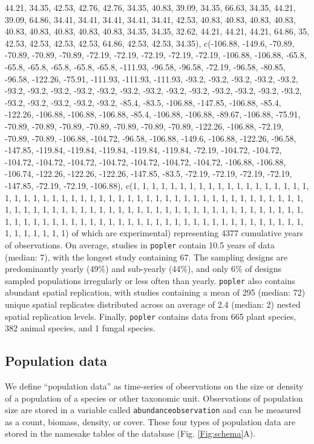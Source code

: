 \documentclass{article}\usepackage[]{graphicx}\usepackage[]{color}
\begin{document}
44.21, 34.35, 42.53, 42.76, 42.76, 34.35, 40.83, 39.09, 34.35, 66.63, 34.35, 44.21, 39.09, 64.86, 34.41, 34.41, 34.41, 34.41, 34.41, 42.53, 40.83, 40.83, 40.83, 40.83, 40.83, 40.83, 40.83, 40.83, 40.83, 34.35, 34.35, 32.62, 44.21, 44.21, 44.21, 64.86, 35, 42.53, 42.53, 42.53, 42.53, 64.86, 42.53, 42.53, 34.35), c(-106.88, -149.6, -70.89, -70.89, -70.89, -70.89, -72.19, -72.19, -72.19, -72.19, -72.19, -106.88, -106.88, -65.8, -65.8, -65.8, -65.8, -65.8, -65.8, -111.93, -96.58, -96.58, -72.19, -96.58, -80.85, -96.58, -122.26, -75.91, -111.93, -111.93, -111.93, -93.2, -93.2, -93.2, -93.2, -93.2, -93.2, -93.2, -93.2, -93.2, -93.2, -93.2, -93.2, -93.2, -93.2, -93.2, -93.2, -93.2, -93.2, -93.2, -93.2, -93.2, -93.2, -93.2, -85.4, -83.5, -106.88, -147.85, -106.88, -85.4, -122.26, -106.88, -106.88, -106.88, -85.4, 
-106.88, -106.88, -89.67, -106.88, -75.91, -70.89, -70.89, -70.89, -70.89, -70.89, -70.89, -70.89, -122.26, -106.88, -72.19, -70.89, -70.89, -106.88, -104.72, -96.58, -106.88, -149.6, -106.88, -122.26, -96.58, -147.85, -119.84, -119.84, -119.84, -119.84, -119.84, -72.19, -104.72, -104.72, -104.72, -104.72, -104.72, -104.72, -104.72, -104.72, -104.72, -106.88, -106.88, -106.74, -122.26, -122.26, -122.26, -147.85, -83.5, -72.19, -72.19, -72.19, -72.19, -147.85, -72.19, -72.19, -106.88), c(1, 1, 1, 1, 1, 1, 1, 1, 1, 1, 1, 1, 1, 1, 1, 1, 1, 1, 1, 1, 1, 1, 1, 1, 1, 1, 1, 1, 1, 1, 1, 1, 1, 1, 1, 1, 1, 1, 1, 1, 1, 1, 1, 1, 1, 1, 1, 1, 1, 1, 1, 1, 1, 1, 1, 1, 1, 1, 1, 1, 1, 1, 1, 1, 1, 1, 1, 1, 1, 1, 1, 1, 1, 1, 1, 1, 1, 1, 1, 1, 1, 1, 1, 1, 1, 1, 1, 1, 1, 1, 1, 1, 1, 1, 1, 1, 1, 1, 1, 1, 1, 1, 1, 1, 1, 1, 1, 1, 1, 1, 1, 1, 1, 1, 1, 1, 1, 1, 1, 1, 1, 1) of which are experimental) representing 4377 cumulative years of observations. On average, studies in \texttt{popler} contain 10.5 years of data (median: 7), with the longest study containing 67. The sampling designs are predominantly yearly (49\%) and sub-yearly (44\%), and only 6\% of designs sampled populations irregularly or less often than yearly. \texttt{popler} also contains abundant spatial replication, with studies containing a mean of 295 (median: 72) unique spatial replicates distributed across an average of 2.4 (median: 2) nested spatial replication levels. Finally, \texttt{popler} contains data from 665 plant species, 382 animal species, and 1 fungal species.


\subsection*{Population data}
We define ``population data'' as time-series of observations on the size or density of a population of a species or other taxonomic unit. Observations of population size are stored in a variable called \texttt{abundance\textunderscore observation} and can be measured as a count, biomass, density, or cover. These four types of population data are stored in the namesake tables of the database (Fig. \ref{Fig:schema}A).
\end{document}
